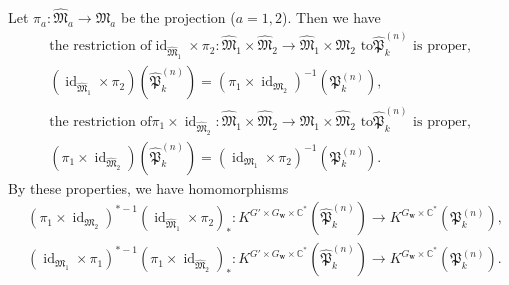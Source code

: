 \documentclass[12pt]{amsart}
\def\Bbb{\mathbb}
\def\frak{\mathfrak}
\renewcommand{\labelenumi}{(\theenumi)}%
\newenvironment{aenume}{%
  \begin{enumerate}%
  \renewcommand{\theenumi}{\alph{enumi}}%
  \renewcommand{\labelenumi}{(\theenumi)}%
  }{\end{enumerate}}
\theoremstyle{definition}
\theoremstyle{remark}
\numberwithin{equation}{subsection}
\newcommand{\C}{{\Bbb C}}
\newcommand{\id}{\operatorname{id}}
\newcommand{\M}{{\frak M}} %
\newcommand{\bw}{{\mathbf w}} %
\newcommand{\Pa}{{\frak P}} %
\newcommand{\Mpp}{\widehat\M}
\begin{document}
Let $\pi_a\colon \Mpp_a\to \M_a$ be the projection
($a = 1,2$). Then we have
\begin{equation}\label{eq:PHecke}
\begin{gathered}
 \text{the restriction of
$\id_{\Mpp_1}\times\pi_2\colon \Mpp_1\times\Mpp_2
\to \Mpp_1\times \M_2$ to
$\widehat\Pa_k^{(n)}$ is proper,} \\
 (\id_{\Mpp_1}\times\pi_2)(\widehat\Pa_k^{(n)})
 = (\pi_1\times\id_{\M_2})^{-1}(\Pa_k^{(n)}), \\
%
 \text{the restriction of
$\pi_1\times\id_{\Mpp_2}\colon \Mpp_1\times\Mpp_2
\to \M_1\times \Mpp_2$ to
$\widehat\Pa_k^{(n)}$ is proper,} \\
%
 (\pi_1\times\id_{\Mpp_2})(\widehat\Pa_k^{(n)})
 = (\id_{\M_1}\times\pi_2)^{-1}(\Pa_k^{(n)}).
\end{gathered}
\end{equation}
By these properties, we have homomorphisms
\begin{equation*}
\begin{split}
  & (\pi_1\times\id_{\M_2})^{*-1}
  \left(\id_{\Mpp_1}\times\pi_2\right)_*\colon
  K^{G'\times G_\bw\times\C^*}(\widehat\Pa_k^{(n)})\to
   K^{G_\bw\times\C^*}(\Pa_k^{(n)}), \\
  & (\id_{\M_1}\times\pi_1)^{*-1}
  \left(\pi_1\times\id_{\Mpp_2}\right)_*\colon
  K^{G'\times G_\bw\times\C^*}(\widehat\Pa_k^{(n)})\to
   K^{G_\bw\times\C^*}(\Pa_k^{(n)}).
\end{split}
\end{equation*}
\end{document}

